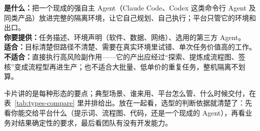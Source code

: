 \begin{tcbraster}[
  raster columns=2,
  raster equal height=rows,
  raster column skip=4mm,
  raster row skip=4mm
]
\begin{tcolorbox}[
  title={T2 · 代码型 Agent：自带程序入驻},
  colback=GoldLight,colframe=Gold,coltitle=white,
  fonttitle=\bfseries\sffamily,fontupper=\small,
  left=2.5mm,right=2.5mm,top=1.5mm,bottom=1.5mm
]
\end{tcolorbox}
\begin{tcolorbox}[
  title={T3 · 自主型 Agent：请专家自己动手},
  colback=RustLight,colframe=Rust,coltitle=white,
  fonttitle=\bfseries\sffamily,fontupper=\small,
  left=2.5mm,right=2.5mm,top=1.5mm,bottom=1.5mm
]
\textbf{是什么：}把一个现成的强自主 Agent（Claude Code、Codex 这类命令行 Agent 及同类产品）放进完整的隔离环境，让它自己规划、自己执行；平台只管它的环境和出口。\\
\textbf{你要提供：}任务描述、环境声明（软件、数据、网络）、选用的第三方 Agent。\\
\textbf{适合：}目标清楚但路径不清楚、需要在真实环境里试错、单次任务价值高的工作。\\
\textbf{不适合：}直接执行高风险副作用——它的产出应经过“探索、提炼成流程图、签核”变成流程型再进生产；也不适合大批量、低单价的重复任务，整机隔离不划算。
\end{tcolorbox}
\end{tcbraster}

卡片讲的是每种形态的要点；典型场景、谁来用、平台怎么管、什么时候交付，在表~\ref{tab:types-compare} 里并排给出。放在一起看，选型的判断依据就清楚了：先看你能交给平台什么（提示词、流程图、代码，还是一个现成的 Agent），再看业务对结果确定性的要求，最后看团队有没有开发能力。


